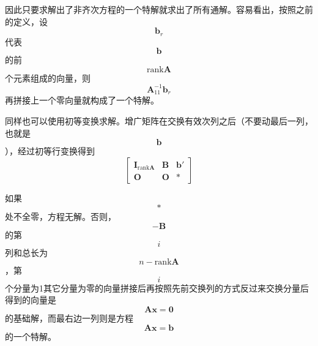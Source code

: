 因此只要求解出了非齐次方程的一个特解就求出了所有通解。容易看出，按照之前的定义，设$$\boldsymbol{b}_r$$代表$$\boldsymbol{b}$$的前$$\mathrm{rank}\boldsymbol{A}$$个元素组成的向量，则$$\boldsymbol{A}_{11}^{-1} \boldsymbol{b}_r$$再拼接上一个零向量就构成了一个特解。

同样也可以使用初等变换求解。增广矩阵在交换有效次列之后（不要动最后一列，也就是$$\boldsymbol{b}$$），经过初等行变换得到
\[
\left[
    \begin{matrix}
        \boldsymbol{I}_{\mathrm{rank}\boldsymbol{A}} & \boldsymbol{B} & \boldsymbol{b}' \\
        \boldsymbol{O} & \boldsymbol{O} & *
    \end{matrix}    
\right]
\]

如果$$*$$处不全零，方程无解。否则，$$-\boldsymbol{B}$$的第$$i$$列和总长为$$n-\mathrm{rank}\boldsymbol{A}$$，第$$i$$个分量为1其它分量为零的向量拼接后再按照先前交换列的方式反过来交换分量后得到的向量是$$\boldsymbol{A} \boldsymbol{x} = \boldsymbol{0}$$的基础解，而最右边一列则是方程$$\boldsymbol{A} \boldsymbol{x} = \boldsymbol{b}$$的一个特解。
